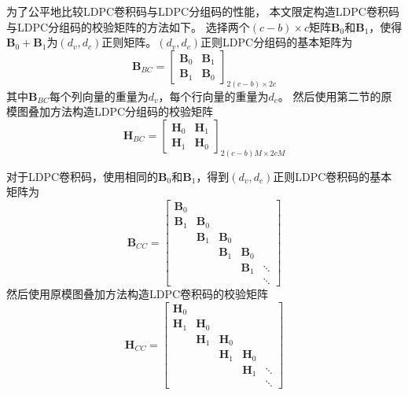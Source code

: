 为了公平地比较LDPC卷积码与LDPC分组码的性能，
本文限定构造LDPC卷积码与LDPC分组码的校验矩阵的方法如下。
选择两个$(c-b)\times c$矩阵$\mathbf{B}_0$和$\mathbf{B}_1$，使得$\mathbf{B}_0 + \mathbf{B}_1$为$(d_v,d_c)$正则矩阵。$(d_v,d_c)$正则LDPC分组码的基本矩阵为
\begin{equation}
    \mathbf{B}_{BC} = \left[
          \begin{array}{cc}
            \mathbf{B}_0 & \mathbf{B}_1\\
            \mathbf{B}_1 & \mathbf{B}_0
          \end{array} \right]_{2(c-b)\times 2c}
\end{equation}
其中$\mathbf{B}_{BC}$每个列向量的重量为$d_v$，每个行向量的重量为$d_c$。
然后使用第二节的原模图叠加方法构造LDPC分组码的校验矩阵
\begin{equation}
    \mathbf{H}_{BC} = \left[
          \begin{array}{cc}
            \mathbf{H}_0 & \mathbf{H}_1\\
            \mathbf{H}_1 & \mathbf{H}_0
          \end{array} \right]_{2(c-b)M \times 2cM}
\end{equation}

对于LDPC卷积码，使用相同的$\mathbf{B}_0$和$\mathbf{B}_1$，得到$(d_v,d_c)$正则LDPC卷积码的基本矩阵为
\begin{equation}
    \mathbf{B}_{CC} = \left[
          \begin{array}{ccccc}
            \mathbf{B}_0 & & & & \\
            \mathbf{B}_1 & \mathbf{B}_0 & & & \\
             & \mathbf{B}_1 & \mathbf{B}_0 & & \\
             & & \mathbf{B}_1 & \mathbf{B}_0 & \\
             & & & \mathbf{B}_1 & \ddots \\
             & & & & \ddots
          \end{array} \right]
\end{equation}
然后使用原模图叠加方法构造LDPC卷积码的校验矩阵
\begin{equation}
    \mathbf{H}_{CC} = \left[
          \begin{array}{ccccc}
            \mathbf{H}_0 & & & & \\
            \mathbf{H}_1 & \mathbf{H}_0 & & & \\
             & \mathbf{H}_1 & \mathbf{H}_0 & & \\
             & & \mathbf{H}_1 & \mathbf{H}_0 & \\
             & & & \mathbf{H}_1 & \ddots \\
             & & & & \ddots
          \end{array} \right]
\end{equation}

